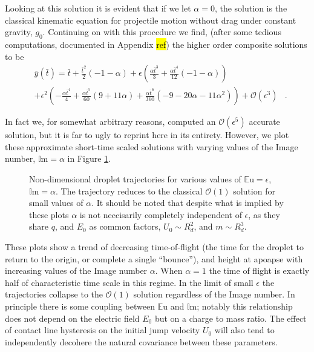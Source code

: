 \documentclass[a4paper, 12pt]{article}
\begin{document}
Looking at this solution it is evident that if we let $\alpha=0$, the solution is the classical kinematic equation for projectile motion without drag under constant gravity, $g_0$. Continuing on with this procedure we find, (after some tedious computations, documented in Appendix \hl{ref}) the higher order composite solutions to be
\begin{eqnarray*}
&\bar{y}(\bar{t}) = \bar{t} + \frac{\bar{t}^{2}}{2} \left(-1 - \alpha\right) + \epsilon \left(\frac{\alpha \bar{t}^{3}}{3} + \frac{\alpha \bar{t}^{4}}{12} \left(-1 - \alpha\right)\right)& \\
&+ \epsilon^{2} \left(- \frac{\alpha \bar{t}^{4}}{4} + \frac{\alpha \bar{t}^{5}}{60} \left(9 + 11 \alpha\right) + \frac{\alpha \bar{t}^{6}}{360} \left(-9 - 20 \alpha - 11 \alpha^{2}\right)\right) + \mathcal{O}(\epsilon^3)&.
\end{eqnarray*}

In fact we, for somewhat arbitrary reasons, computed an $\mathcal{O}(\epsilon^5)$ accurate solution, but it is far to ugly to reprint here in its entirety. However, we plot these approximate short-time scaled solutions with varying values of the Image number, $\mathbb{I}\mbox{m} = \alpha$ in Figure \ref{fig:short_times}.
\begin{figure}[htb]
    \centering
    \resizebox{1\textwidth}{!}{}
    \caption{Non-dimensional droplet trajectories for various values of $\mathbb{E}\mbox{u}=\epsilon$, $\mathbb{I}\mbox{m}=\alpha$. The trajectory reduces to the classical $\mathcal{O}(1)$ solution for small values of $\alpha$. It should be noted that despite what is implied by these plots $\alpha$ is not neccisarily completely independent of $\epsilon$, as they share $q$, and $E_0$ as common factors, $U_0 \sim R_d^2$, and $m \sim R_d^3$.}
    \label{fig:short_times}
\end{figure}
These plots show a trend of decreasing time-of-flight (the time for the droplet to return to the origin, or complete a single ``bounce''), and height at apoapse with increasing values of the Image number $\alpha$. When $\alpha = 1$ the time of flight is exactly half of characteristic time scale in this regime. In the limit of small $\epsilon$ the trajectories collapse to the $\mathcal{O}(1)$ solution regardless of the Image number. In principle there is some coupling between $\mathbb{E}\mbox{u}$ and $\mathbb{I}\mbox{m}$; notably this relationship does not depend on the electric field $E_0$ but on a charge to mass ratio. The effect of contact line hysteresis on the initial jump velocity $U_0$ will also tend to independently decohere the natural covariance between these parameters.
\end{document}
